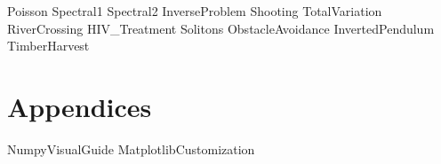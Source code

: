 \documentclass[opener-c,labs,green,nociteref]{HJnewsiambook}
\begin{document}
{Poisson}
{Spectral1}
{Spectral2}
{InverseProblem}
{Shooting}
{TotalVariation}
{RiverCrossing}
{HIV_Treatment}
{Solitons}
{ObstacleAvoidance}
{InvertedPendulum}
{TimberHarvest}

\fi

\part{Appendices}
\begin{appendices}
{NumpyVisualGuide}
{MatplotlibCustomization}
\end{appendices}



\end{document}
